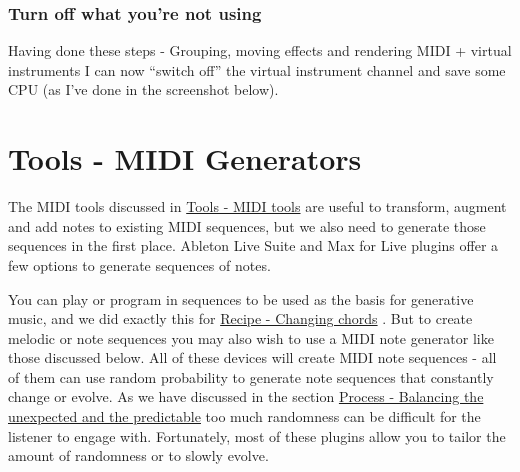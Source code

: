 \documentclass[
  12pt,
  letterpaper,
  oneside,
  open=any]{scrbook}
\makeatletter
\newcommand*\pandocbounded[1]{%
  \sbox\pandoc@box{#1}%
  \Gscale@div\@tempa{\textheight}{\dimexpr\ht\pandoc@box+\dp\pandoc@box\relax}%
  \Gscale@div\@tempb{\linewidth}{\wd\pandoc@box}%
  \ifdim\@tempb\p@<\@tempa\p@\let\@tempa\@tempb\fi%
  \ifdim\@tempa\p@<\p@\scalebox{\@tempa}{\usebox\pandoc@box}%
  \else\usebox{\pandoc@box}%
  \fi%
}
\makeatother
\begin{document}
\subsection{Turn off what you're not
using}\label{turn-off-what-youre-not-using}

Having done these steps - Grouping, moving effects and rendering MIDI +
virtual instruments I can now ``switch off'' the virtual instrument
channel and save some CPU (as I've done in the screenshot below).

\pandocbounded{\texttt{[image: images/Workflow3\_Rendered.png]}}


\chapter{Tools - MIDI Generators}\label{012-Tools-MIDI_Generators}

The MIDI tools discussed in \hyperref[004-Tools-MIDI_tools]{Tools - MIDI
tools} are useful to transform, augment and add notes to existing MIDI
sequences, but we also need to generate those sequences in the first
place. Ableton Live Suite and Max for Live plugins offer a few options
to generate sequences of notes.

\begin{tcolorbox}[enhanced jigsaw, toprule=.15mm, leftrule=.75mm, coltitle=black, bottomtitle=1mm, colbacktitle=quarto-callout-tip-color!10!white, bottomrule=.15mm, opacityback=0, colback=white, arc=.35mm, colframe=quarto-callout-tip-color-frame, opacitybacktitle=0.6, toptitle=1mm, titlerule=0mm, rightrule=.15mm, title=\textcolor{quarto-callout-tip-color}{\faLightbulb}\hspace{0.5em}{Key idea}, left=2mm, breakable]

You can play or program in sequences to be used as the basis for
generative music, and we did exactly this for
\hyperref[001-Recipe-Changing_Chords]{Recipe - Changing chords} . But to
create melodic or note sequences you may also wish to use a MIDI note
generator like those discussed below. All of these devices will create
MIDI note sequences - all of them can use random probability to generate
note sequences that constantly change or evolve. As we have discussed in
the section
\hyperref[009-Process-Balance_unexpected_and_predictable]{Process -
Balancing the unexpected and the predictable} too much randomness can be
difficult for the listener to engage with. Fortunately, most of these
plugins allow you to tailor the amount of randomness or to slowly
evolve.

\end{tcolorbox}
\end{document}
